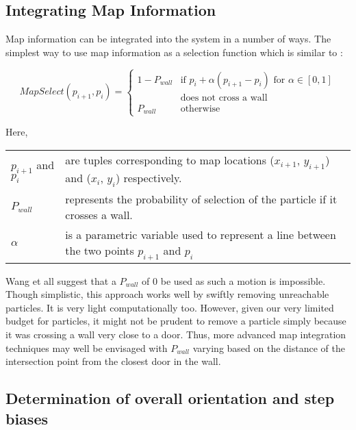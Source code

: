 \subsection{Integrating Map Information}

Map information can be integrated into the system in a number 
of ways. The simplest way to use map information as a selection 
function which is similar to \cite{Wang}:

\begin{equation}\label{eq:select}
MapSelect(p_{i+1}, p_i) = \begin{cases}1 - P_{wall} & \text{if $p_i + \alpha (p_{i+1} - p_i)$ for $\alpha \in [0,1]$} \\
                                                    & \text{does not cross a wall}\\
                                    P_{wall} & \text{otherwise}
                          \end{cases}
\end{equation}

Here,\\
\begin{tabular}{p{1.5in} p{3.5in}}
$p_{i+1}$ and $p_i$ &   are tuples corresponding to map locations ($x_{i+1}$, $y_{i+1}$) and ($x_i$, $y_i$) respectively. \\
$P_{wall}$ &   represents the probability of selection of the particle if it crosses a wall. \\
$\alpha$ & is a parametric variable used to represent a line between the two points $p_{i+1}$ and $p_i$ \\
\end{tabular}

Wang et all\cite{Wang} suggest that a $P_{wall}$ of 0 be used as such a motion
is impossible. Though simplistic, this approach works well by swiftly removing
unreachable particles. It is very light computationally too. However, given our
very limited budget for particles, it might not be prudent to remove a particle
simply because it was crossing a wall very close to a door. Thus, more advanced
map integration techniques may well be envisaged with $P_{wall}$ varying based
on the distance of the intersection point from the closest door in the wall. 

\subsection{Determination of overall orientation and step biases\label{sec:overall_bias}}

